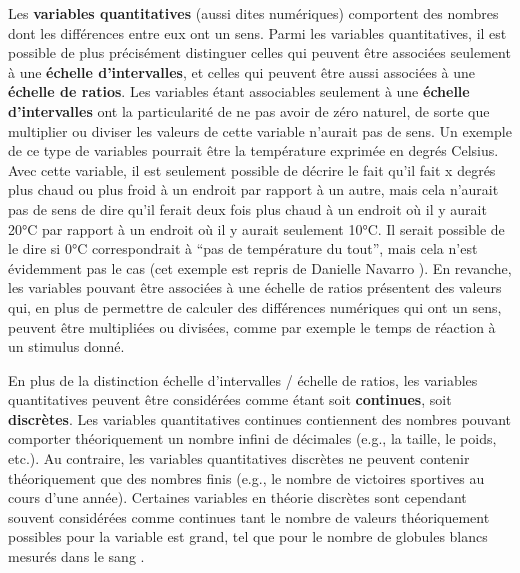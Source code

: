 \documentclass[
]{book}
\begin{document}
Les \textbf{variables quantitatives} (aussi dites numériques) comportent des nombres dont les différences entre eux ont un sens. Parmi les variables quantitatives, il est possible de plus précisément distinguer celles qui peuvent être associées seulement à une \textbf{échelle d'intervalles}, et celles qui peuvent être aussi associées à une \textbf{échelle de ratios}. Les variables étant associables seulement à une \textbf{échelle d'intervalles} ont la particularité de ne pas avoir de zéro naturel, de sorte que multiplier ou diviser les valeurs de cette variable n'aurait pas de sens. Un exemple de ce type de variables pourrait être la température exprimée en degrés Celsius. Avec cette variable, il est seulement possible de décrire le fait qu'il fait x degrés plus chaud ou plus froid à un endroit par rapport à un autre, mais cela n'aurait pas de sens de dire qu'il ferait deux fois plus chaud à un endroit où il y aurait 20°C par rapport à un endroit où il y aurait seulement 10°C. Il serait possible de le dire si 0°C correspondrait à ``pas de température du tout'', mais cela n'est évidemment pas le cas (cet exemple est repris de Danielle Navarro \autocite*{navarroLearningStatistics2018}). En revanche, les variables pouvant être associées à une échelle de ratios présentent des valeurs qui, en plus de permettre de calculer des différences numériques qui ont un sens, peuvent être multipliées ou divisées, comme par exemple le temps de réaction à un stimulus donné.

En plus de la distinction échelle d'intervalles / échelle de ratios, les variables quantitatives peuvent être considérées comme étant soit \textbf{continues}, soit \textbf{discrètes}. Les variables quantitatives continues contiennent des nombres pouvant comporter théoriquement un nombre infini de décimales (e.g., la taille, le poids, etc.). Au contraire, les variables quantitatives discrètes ne peuvent contenir théoriquement que des nombres finis (e.g., le nombre de victoires sportives au cours d'une année). Certaines variables en théorie discrètes sont cependant souvent considérées comme continues tant le nombre de valeurs théoriquement possibles pour la variable est grand, tel que pour le nombre de globules blancs mesurés dans le sang \autocite{labreucheDifferentsTypesVariables2010}.
\end{document}
